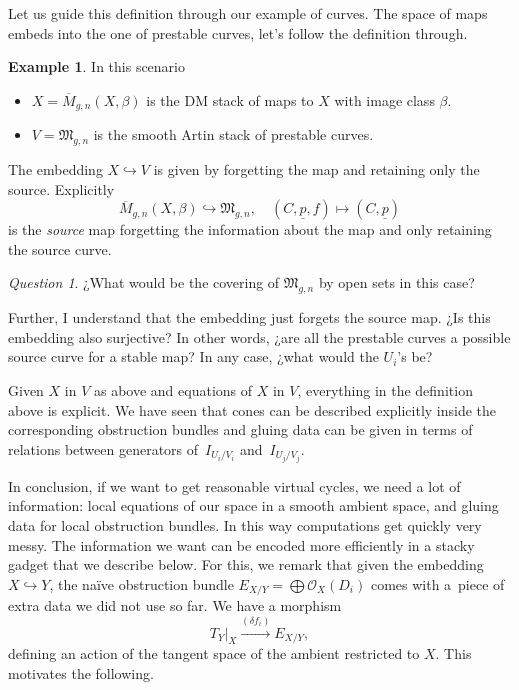 \documentclass[pdftex]{sigma}
\numberwithin{equation}{section}
\providecommand{\lie}[1]{\mathfrak{#1}}
\providecommand{\ov}{\overline}
\providecommand{\un}{\underline}
\providecommand{\hookto}{\hookrightarrow}
\providecommand{\bt}{\beta}
\theoremstyle{plain}
\theoremstyle{definition}
\newtheorem{Ex}[Th]{Example}
\theoremstyle{remark}
\newtheorem*{Qn}{Question}
\begin{document}
\begin{ptcb}
  Let us guide this definition through our example of curves. The space of maps embeds into the one of prestable curves, let's follow the definition through.
  \begin{Ex}
    In this scenario 
    \begin{itemize}
      \item \(X=\ov{M}_{g,n}(X,\bt)\) is the DM stack of maps to \(X\) with image class \(\bt\).
      \item \(V=\lie{M}_{g,n}\) is the smooth Artin stack of prestable curves. 
    \end{itemize}
    The embedding \(X\hookto V\) is given by forgetting the map and retaining only the source. Explicitly
    \[
      \ov{M}_{g,n}(X,\bt)\hookto\lie{M}_{g,n},\quad (C,\un{p},f)\mapsto (C,\un{p})
    \]
    is the \emph{source} map forgetting the information about the map and only retaining the source curve.

    \begin{Qn}
      ¿What would be the covering of \(\lie{M}_{g,n}\) by open sets in this case?\par
      Further, I understand that the embedding just forgets the source map. ¿Is this embedding also surjective? In other words, ¿are all the prestable curves a possible source curve for a stable map? In any case, ¿what would the \(U_i\)'s be?
    \end{Qn}
  \end{Ex}
\end{ptcb}
\begin{Remark} Given $X$ in $V$ as above and equations of $X$ in $V$, everything in the definition above is explicit. We have seen that cones can be described explicitly inside the corresponding obstruction bundles and gluing data can be given in terms of relations between generators of~$I_{U_i/V_i}$ and~$I_{U_j/V_j}$.
\end{Remark}
In conclusion, if we want to get reasonable virtual cycles, we need a lot of information: local equations of our space in a smooth ambient space, and gluing data for local obstruction bundles. In this way computations get quickly very messy. The information we want can be encoded more efficiently in a stacky gadget that we describe below. For this, we remark that given the embedding $X\hookrightarrow Y$, the na\"ive obstruction bundle $E_{X/Y}=\bigoplus \mathcal O_X(D_i)$ comes with a~piece of extra data we did not use so far. We have a morphism
\begin{equation}\label{action}T_Y\rvert_X\xrightarrow{(\delta f_i)} E_{X/Y},
\end{equation}
defining an action of the tangent space of the ambient restricted to $X$. This motivates the following.
\end{document}
